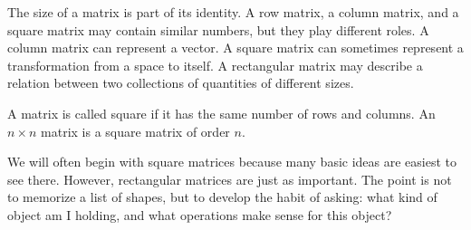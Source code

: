 The size of a matrix is part of its identity. A row matrix, a column matrix, and a square matrix may contain similar numbers, but they play different roles. A column matrix can represent a vector. A square matrix can sometimes represent a transformation from a space to itself. A rectangular matrix may describe a relation between two collections of quantities of different sizes.

\begin{definitionbox}
A matrix is called square if it has the same number of rows and columns. An \(n\times n\) matrix is a square matrix of order \(n\).
\end{definitionbox}

We will often begin with square matrices because many basic ideas are easiest to see there. However, rectangular matrices are just as important. The point is not to memorize a list of shapes, but to develop the habit of asking: what kind of object am I holding, and what operations make sense for this object?
